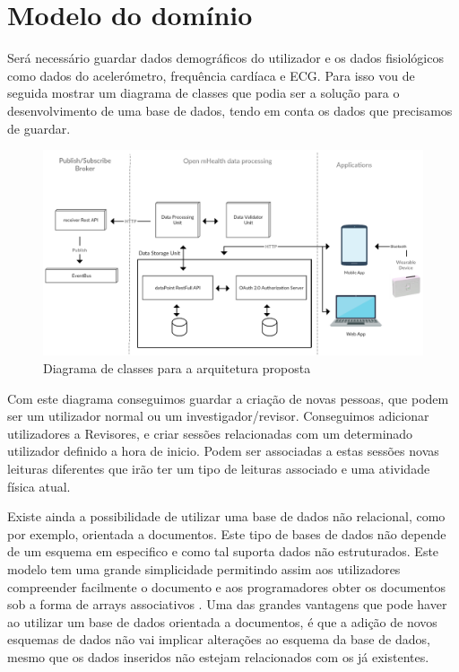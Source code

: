 \section{Modelo do domínio}

Será necessário guardar dados demográficos do utilizador e os dados fisiológicos como dados do acelerómetro, frequência cardíaca e \gls{ECG}. Para isso vou de seguida mostrar um diagrama de classes que podia ser a solução para o desenvolvimento de uma base de dados, tendo em conta os dados que precisamos de guardar.

\begin{figure}[H]
  \centering
  \includegraphics[width=1\textwidth]{imgs/class-diagram.png}
  \caption[Diagrama de classes para a arquitetura proposta]{Diagrama de classes para a arquitetura proposta}
  
  \label{f:class-diagram}
\end{figure}

Com este diagrama conseguimos guardar a criação de novas pessoas, que podem ser um utilizador normal ou um investigador/revisor. Conseguimos adicionar utilizadores a Revisores, e criar sessões relacionadas com um determinado utilizador definido a hora de inicio. Podem ser associadas a estas sessões novas leituras diferentes que irão ter um tipo de leituras associado e uma atividade física atual.
\par 
Existe ainda a possibilidade de utilizar uma base de dados não relacional, como por exemplo, orientada a documentos. Este tipo de bases de dados não depende de um esquema em especifico e como tal suporta dados não estruturados. Este modelo tem uma grande simplicidade permitindo assim aos utilizadores compreender facilmente o documento e aos programadores  obter os documentos sob a forma de arrays associativos \cite{nosql}. Uma das grandes vantagens que pode haver ao utilizar um base de dados orientada a documentos, é que a adição de novos esquemas de dados não vai implicar alterações ao esquema da base de dados, mesmo que os dados inseridos não estejam relacionados com os já existentes.

